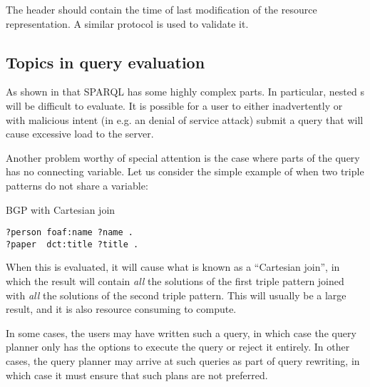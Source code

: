 The  header should contain the time of last
modification of the resource representation. A similar protocol is
used to validate it.

\subsection{Topics in query evaluation}\label{sec:prelimquery}

As shown in \cite{perez2009semantics} that SPARQL has some highly
complex parts. In particular, nested s will be
difficult to evaluate. It is possible for a user to either inadvertently
or with malicious intent (in e.g. an denial of service attack) submit
a query that will cause excessive load to the server.

Another problem worthy of special attention is the case where parts of
the query has no connecting variable. Let us consider the
simple example of when two triple patterns do not share a variable:
\begin{example}{BGP with Cartesian join}\label{ex:cartesian}
\begin{verbatim}
?person foaf:name ?name .
?paper  dct:title ?title .
\end{verbatim}
\end{example}
When this is evaluated, it will cause what is known as a ``Cartesian
join'', in which the result will contain \emph{all} the solutions of
the first triple pattern joined with \emph{all} the solutions of the
second triple pattern. This will usually be a large result, and it is
also resource consuming to compute.

In some cases, the users may have written such a query, in which case
the query planner only has the options to execute the query or reject
it entirely. In other cases, the query planner may arrive at such
queries as part of query rewriting, in which case it must ensure that
such plans are not preferred.

